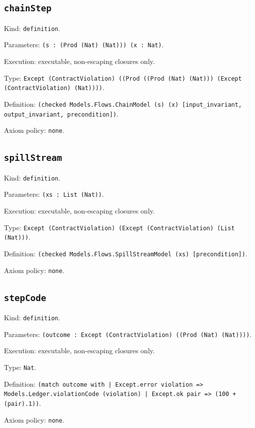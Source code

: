 \documentclass[11pt]{article}
\begin{document}
\subsection*{\texttt{chainStep}}
\noindent Kind: \texttt{definition}.\par
\noindent Parameters: \texttt{(s : (Prod (Nat) (Nat))) (x : Nat)}.\par
\noindent Execution: executable, non-escaping closures only.\par
\noindent Type: \texttt{Except (ContractViolation) ((Prod ((Prod (Nat) (Nat))) (Except (ContractViolation) (Nat))))}.\par
\noindent Definition: \texttt{(checked Models.Flows.ChainModel (s) (x) [input\_invariant, output\_invariant, precondition])}.\par
\noindent Axiom policy: \texttt{none}.\par
\subsection*{\texttt{spillStream}}
\noindent Kind: \texttt{definition}.\par
\noindent Parameters: \texttt{(xs : List (Nat))}.\par
\noindent Execution: executable, non-escaping closures only.\par
\noindent Type: \texttt{Except (ContractViolation) (Except (ContractViolation) (List (Nat)))}.\par
\noindent Definition: \texttt{(checked Models.Flows.SpillStreamModel (xs) [precondition])}.\par
\noindent Axiom policy: \texttt{none}.\par
\subsection*{\texttt{stepCode}}
\noindent Kind: \texttt{definition}.\par
\noindent Parameters: \texttt{(outcome : Except (ContractViolation) ((Prod (Nat) (Nat))))}.\par
\noindent Execution: executable, non-escaping closures only.\par
\noindent Type: \texttt{Nat}.\par
\noindent Definition: \texttt{(match outcome with | Except.error violation => Models.Ledger.violationCode (violation) | Except.ok pair => (100 + (pair).1))}.\par
\noindent Axiom policy: \texttt{none}.\par
\end{document}
